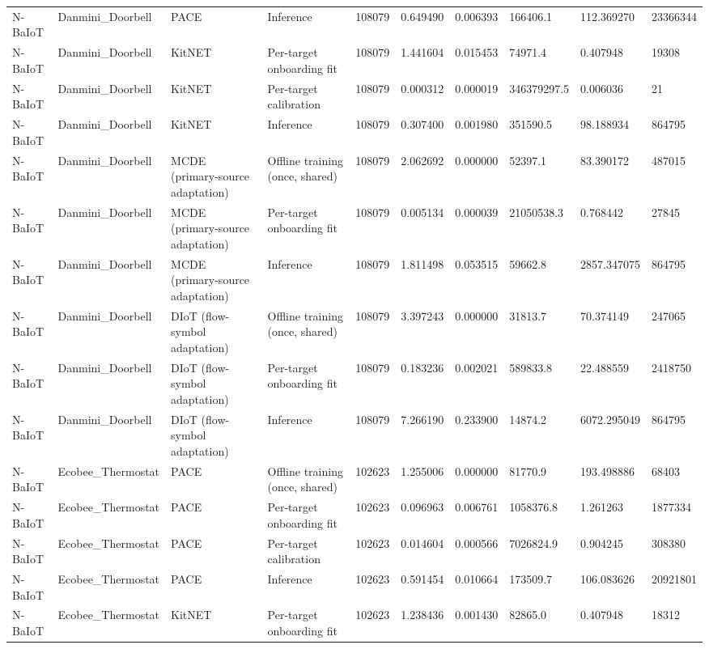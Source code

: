 \begin{tabular}{llllllllll}
N-BaIoT & Danmini\_Doorbell & PACE & Inference & 108079 & 0.649490 & 0.006393 & 166406.1 & 112.369270 & 23366344 \\
N-BaIoT & Danmini\_Doorbell & KitNET & Per-target onboarding fit & 108079 & 1.441604 & 0.015453 & 74971.4 & 0.407948 & 19308 \\
N-BaIoT & Danmini\_Doorbell & KitNET & Per-target calibration & 108079 & 0.000312 & 0.000019 & 346379297.5 & 0.006036 & 21 \\
N-BaIoT & Danmini\_Doorbell & KitNET & Inference & 108079 & 0.307400 & 0.001980 & 351590.5 & 98.188934 & 864795 \\
N-BaIoT & Danmini\_Doorbell & MCDE (primary-source adaptation) & Offline training (once, shared) & 108079 & 2.062692 & 0.000000 & 52397.1 & 83.390172 & 487015 \\
N-BaIoT & Danmini\_Doorbell & MCDE (primary-source adaptation) & Per-target onboarding fit & 108079 & 0.005134 & 0.000039 & 21050538.3 & 0.768442 & 27845 \\
N-BaIoT & Danmini\_Doorbell & MCDE (primary-source adaptation) & Inference & 108079 & 1.811498 & 0.053515 & 59662.8 & 2857.347075 & 864795 \\
N-BaIoT & Danmini\_Doorbell & DIoT (flow-symbol adaptation) & Offline training (once, shared) & 108079 & 3.397243 & 0.000000 & 31813.7 & 70.374149 & 247065 \\
N-BaIoT & Danmini\_Doorbell & DIoT (flow-symbol adaptation) & Per-target onboarding fit & 108079 & 0.183236 & 0.002021 & 589833.8 & 22.488559 & 2418750 \\
N-BaIoT & Danmini\_Doorbell & DIoT (flow-symbol adaptation) & Inference & 108079 & 7.266190 & 0.233900 & 14874.2 & 6072.295049 & 864795 \\
N-BaIoT & Ecobee\_Thermostat & PACE & Offline training (once, shared) & 102623 & 1.255006 & 0.000000 & 81770.9 & 193.498886 & 68403 \\
N-BaIoT & Ecobee\_Thermostat & PACE & Per-target onboarding fit & 102623 & 0.096963 & 0.006761 & 1058376.8 & 1.261263 & 1877334 \\
N-BaIoT & Ecobee\_Thermostat & PACE & Per-target calibration & 102623 & 0.014604 & 0.000566 & 7026824.9 & 0.904245 & 308380 \\
N-BaIoT & Ecobee\_Thermostat & PACE & Inference & 102623 & 0.591454 & 0.010664 & 173509.7 & 106.083626 & 20921801 \\
N-BaIoT & Ecobee\_Thermostat & KitNET & Per-target onboarding fit & 102623 & 1.238436 & 0.001430 & 82865.0 & 0.407948 & 18312 \\

\end{tabular}
